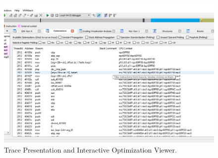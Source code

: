 \documentclass[10pt,twoside,a4paper,bibliography=totoc]{scrbook}
\begin{document}
\begin{figure}[htp]
\centering
\includegraphics[scale=0.40]{images/ch3/optimizations1.png}
\caption{Trace Presentation and Interactive Optimization Viewer.}
\label{opti1}
\end{figure}
\end{document}

